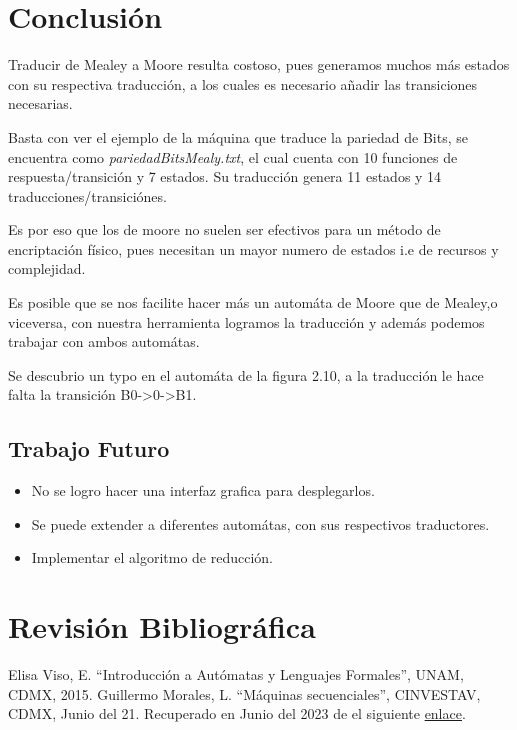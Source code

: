 \documentclass[11pt,letterpaper]{article}
\begin{document}
\begin{multicols}{2}
  \section{Conclusión}

  Traducir de Mealey a Moore resulta costoso, pues generamos muchos más estados con
  su respectiva traducción, a los cuales es necesario añadir las transiciones necesarias.

  Basta con ver el ejemplo de la máquina que traduce la pariedad de Bits, se encuentra
  como {\it pariedadBitsMealy.txt}, el cual cuenta con 10 funciones de respuesta/transición
  y 7 estados. Su traducción genera 11 estados y 14 traducciones/transiciónes. 
  
  Es por eso que los de moore no suelen ser efectivos para un método de encriptación físico,
  pues necesitan un mayor numero de estados i.e de recursos y complejidad.

  Es posible que se nos facilite hacer más un automáta de Moore que de Mealey,o viceversa,
  con nuestra herramienta logramos la traducción y además podemos trabajar con ambos automátas.
  
  Se descubrio un typo en el automáta de la figura 2.10\cite{Viso}, a la traducción
  le hace falta la transición B0->0->B1.
  \subsection{Trabajo Futuro}

  \begin{itemize}
  \item No se logro hacer una interfaz grafica para desplegarlos.

  \item Se puede extender a diferentes automátas, con sus respectivos traductores.
    
  \item Implementar el algoritmo de reducción.
  \end{itemize}
  
    \section{Revisión Bibliográfica}  
    \begin{thebibliography}{1}
   Elisa Viso, E. ``Introducción a Autómatas y Lenguajes Formales'',
    UNAM, CDMX, 2015.
   Guillermo Morales, L.  ``Máquinas secuenciales'',
    CINVESTAV, CDMX, Junio del 21. Recuperado en Junio del 2023 de el siguiente
    \href{https://delta.cs.cinvestav.mx/~gmorales/ta/node48.html}{enlace}.
  \end{thebibliography}  
\end{multicols}
\end{document}
